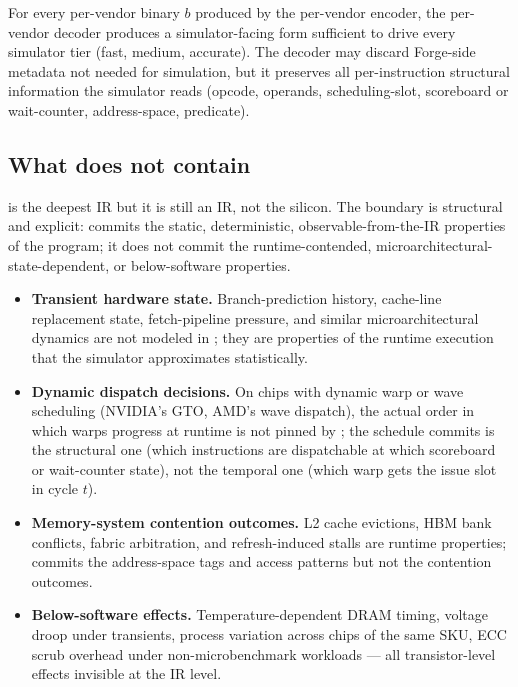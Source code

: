 \begin{property}
\label{prop:ir003-decode-faithful}
For every per-vendor binary $b$ produced by the per-vendor encoder, the per-vendor decoder produces a simulator-facing form sufficient to drive every simulator tier (fast, medium, accurate).
The decoder may discard Forge-side metadata not needed for simulation, but it preserves all per-instruction structural information the simulator reads (opcode, operands, scheduling-slot, scoreboard or wait-counter, address-space, predicate).
\end{property}

\subsection{What  does not contain}
\label{sec:ir003-not}

 is the deepest IR but it is still an IR, not the silicon.
The boundary is structural and explicit:  commits the static, deterministic, observable-from-the-IR properties of the program; it does not commit the runtime-contended, microarchitectural-state-dependent, or below-software properties.

\begin{itemize}
  \item \textbf{Transient hardware state.}
        Branch-prediction history, cache-line replacement state, fetch-pipeline pressure, and similar microarchitectural dynamics are not modeled in ; they are properties of the runtime execution that the simulator approximates statistically.

  \item \textbf{Dynamic dispatch decisions.}
        On chips with dynamic warp or wave scheduling (NVIDIA's GTO, AMD's wave dispatch), the actual order in which warps progress at runtime is not pinned by ; the schedule  commits is the structural one (which instructions are dispatchable at which scoreboard or wait-counter state), not the temporal one (which warp gets the issue slot in cycle $t$).

  \item \textbf{Memory-system contention outcomes.}
        L2 cache evictions, HBM bank conflicts, fabric arbitration, and refresh-induced stalls are runtime properties;  commits the address-space tags and access patterns but not the contention outcomes.

  \item \textbf{Below-software effects.}
        Temperature-dependent DRAM timing, voltage droop under transients, process variation across chips of the same SKU, ECC scrub overhead under non-microbenchmark workloads --- all transistor-level effects invisible at the IR level.
\end{itemize}

